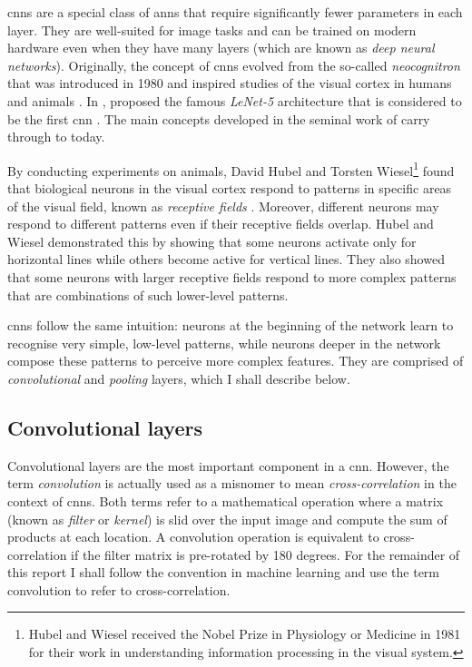 \documentclass[../report.tex]{subfiles}
\begin{document}
\Glspl{cnn} are a special class of \glspl{ann} that require significantly fewer parameters in each layer.
They are well-suited for image tasks and can be trained on modern hardware even when they have many layers (which are known as \emph{deep neural networks}).
Originally, the concept of \glspl{cnn} evolved from the so-called \emph{neocognitron} that was introduced in 1980 and inspired studies of the visual cortex in humans and animals \cite{fukushima1980}.
In \citeyear{lecun1998}, \citeauthor{lecun1998} proposed the famous \emph{LeNet-5} architecture that is considered to be the first \gls{cnn} \cite{lecun1998}. 
The main concepts developed in the seminal work of \citeauthor{lecun1998} carry through to today.

By conducting experiments on animals, David Hubel and Torsten Wiesel\footnote{Hubel and Wiesel received the Nobel Prize in Physiology or Medicine in 1981 for their work in understanding information processing in the visual system.} found that biological neurons in the visual cortex respond to patterns in specific areas of the visual field, known as \emph{receptive fields} \cite{hubel1959}.
Moreover, different neurons may respond to different patterns even if their receptive fields overlap.
Hubel and Wiesel demonstrated this by showing that some neurons activate only for horizontal lines while others become active for vertical lines.
They also showed that some neurons with larger receptive fields respond to more complex patterns that are combinations of such lower-level patterns.

\Glspl{cnn} follow the same intuition: neurons at the beginning of the network learn to recognise very simple, low-level patterns, while neurons deeper in the network compose these patterns to perceive more complex features.
They are comprised of \emph{convolutional} and \emph{pooling} layers, which I shall describe below.

\subsection{Convolutional layers}
\label{sec:convolutional_layers}
Convolutional layers are the most important component in a \gls{cnn}.
However, the term \emph{convolution} is actually used as a misnomer to mean \emph{cross-correlation} in the context of \glspl{cnn}.
Both terms refer to a mathematical operation where a matrix (known as \emph{filter} or \emph{kernel}) is slid over the input image and compute the sum of products at each location.
A convolution operation is equivalent to cross-correlation if the filter matrix is pre-rotated by 180 degrees.
For the remainder of this report I shall follow the convention in machine learning and use the term convolution to refer to cross-correlation.
\end{document}
